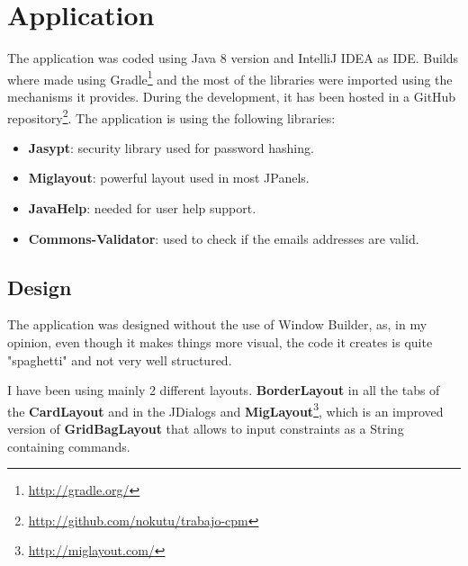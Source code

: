\documentclass[12pt]{article}
\begin{document}
   \section{Application}
   The application was coded using Java 8 version and IntelliJ IDEA as IDE. Builds where made using Gradle\footnote{\url{http://gradle.org/}} and the most of the libraries were imported using the mechanisms it provides. During the development, it has been hosted in a GitHub repository\footnote{\url{http://github.com/nokutu/trabajo-cpm}}. The application is using the following libraries:
   \begin{itemize}
	   	\item \textbf{Jasypt}: security library used for password hashing.
	   	\item \textbf{Miglayout}: powerful layout used in most JPanels.
	   	\item \textbf{JavaHelp}: needed for user help support.
	   	\item \textbf{Commons-Validator}: used to check if the emails addresses are valid.
   \end{itemize}
   \subsection{Design}
   The application was designed without the use of Window Builder, as, in my opinion, even though it makes things more visual, the code it creates is quite "spaghetti" and not very well structured.
   
   I have been using mainly 2 different layouts. \textbf{BorderLayout} in all the tabs of the \textbf{CardLayout} and in the JDialogs and \textbf{MigLayout}\footnote{\url{http://miglayout.com/}}, which is an improved  version of \textbf{GridBagLayout} that allows to input constraints as a String containing commands.
   
\end{document}
